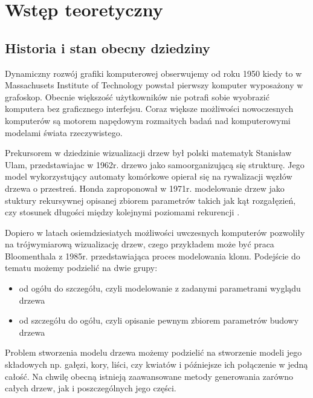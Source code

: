 \chapter{Wstęp teoretyczny}



\section{Historia i stan obecny dziedziny}
Dynamiczny rozwój grafiki komputerowej obserwujemy od roku 1950 kiedy to w Massachusets Institute of Technology \cite{jankowski} powstał pierwszy
komputer wyposażony w grafoskop. Obecnie większość użytkowników nie potrafi sobie wyobrazić komputera bez graficznego interfejsu.
Coraz większe możliwości nowoczesnych komputerów są motorem napędowym rozmaitych badań nad komputerowymi modelami świata rzeczywistego.

Prekursorem w dziedzinie wizualizacji drzew był polski matematyk Stanisław Ulam, przedstawiajac w 1962r. \cite{ulam} drzewo jako samoorganizującą się
strukturę. Jego model wykorzystujący automaty komórkowe opierał się na rywalizacji węzłów  drzewa o przestreń.
Honda zaproponował w 1971r. modelowanie drzew jako stuktury rekursywnej opisanej
zbiorem parametrów takich jak kąt rozgałęzień, czy stosunek długości między kolejnymi poziomami rekurencji \cite{honda}.

Dopiero w latach osiemdziesiatych
możliwości uwczesnych komputerów pozwoliły na trójwymiarową wizualizację drzew, czego przykładem może być praca Bloomenthala z 1985r. \cite{bloomenthal}
przedstawiająca proces modelowania klonu. Podejście do tematu możemy podzielić na dwie grupy:
\begin{itemize}
\item od ogółu do szczegółu, czyli modelowanie z zadanymi parametrami wyglądu drzewa
\item od szczegółu do ogółu, czyli opisanie pewnym zbiorem parametrów budowy drzewa
\end{itemize}
Problem stworzenia modelu drzewa możemy podzielić na stworzenie modeli jego składowych np. gałęzi, kory, liści, czy kwiatów i późniejsze
ich połączenie w jedną całość. Na chwilę obecną istnieją zaawansowane metody generowania zarówno całych drzew, jak i poszczególnych jego części.

